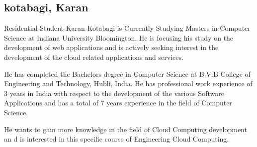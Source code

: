 \subsection{kotabagi, Karan}
Residential Student 
Karan Kotabagi is Currently Studying Masters in Computer Science at Indiana 
University Bloomington. He is focusing his  study on the development of web 
applications and is actively seeking interest in the development of the cloud 
related applications and services.

He has completed the Bachelors degree in Computer Science at B.V.B College of 
Engineering and Technology, Hubli, India. He has professional work experience 
of 3 years in India with respect to  the development of the various Software 
Applications and has a total of 7 years experience in the field of Computer 
Science.

He wants to gain more knowledge in the field of Cloud Computing development an
d  is interested in this specific course of Engineering Cloud Computing.
